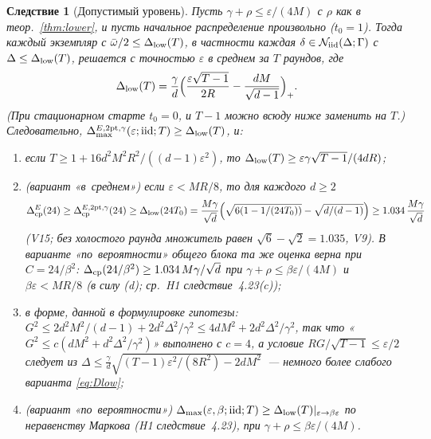 \documentclass[11pt,a4paper]{article}
\numberwithin{equation}{section}
\newtheorem{corollary}[theorem]{Следствие}
\theoremstyle{definition}
\theoremstyle{remark}
\newcommand{\Dmax}{\Delta_{\max}}\newcommand{\Dcp}{\Delta_{\rm cp}}\newcommand{\Dlow}{\Delta_{\rm low}}
\newcommand{\cN}{\mathcal N}\newcommand{\cA}{\mathcal A}\newcommand{\cG}{\mathcal G}\newcommand{\cF}{\mathcal F}
\newcommand{\wbar}{\bar\omega}\newcommand{\Atwo}{\cA^{\rm 2pt}_\gamma}
\begin{document}
\begin{corollary}[Допустимый уровень]\label{cor:lower}
Пусть $\gamma+\rho\le\varepsilon/(4M)$ с $\rho$ как в теор.~\ref{thm:lower}, и пусть начальное распределение произвольно ($t_0=1$). Тогда каждый экземпляр с $\wbar/2\le\Dlow(T)$, в частности каждая $\delta\in\cN_\iid(\Delta;\Gamma)$ с $\Delta\le\Dlow(T)$, решается с точностью $\varepsilon$ в среднем за $T$ раундов, где
\begin{equation}\label{eq:Dlow}
\Dlow(T)=\frac\gamma d\Big(\frac{\varepsilon\sqrt{T-1}}{2R}-\frac{dM}{\sqrt{d-1}}\Big)_+ .
\end{equation}
(При стационарном старте $t_0=0$, и $T-1$ можно всюду ниже заменить на $T$.) Следовательно, $\Dmax^{E,\mathrm{2pt},\gamma}(\varepsilon;\iid;T)\ge\Dlow(T)$, и:
\begin{enumerate}[label=(\alph*)]
\item если $T\ge1+16d^2M^2R^2/((d-1)\varepsilon^2)$, то $\Dlow(T)\ge\varepsilon\gamma\sqrt{T-1}/(4dR)$;
\item (вариант «в~среднем») если $\varepsilon<MR/8$, то для каждого $d\ge2$
\[\Dcp^{E}(24)\ge\Dcp^{E,\mathrm{2pt},\gamma}(24)\ge\Dlow(24T_0)=\frac{M\gamma}{\sqrt d}\Big(\sqrt{6(1-1/(24T_0))}-\sqrt{d/(d-1)}\Big)\ge1.034\,\frac{M\gamma}{\sqrt d}\] (V15; без холостого раунда множитель равен $\sqrt6-\sqrt2=1.035$, V9). В варианте «по~вероятности» общего блока та же оценка верна при $C=24/\beta^2$: $\Dcp(24/\beta^2)\ge1.034\,M\gamma/\sqrt d$ при $\gamma+\rho\le\beta\varepsilon/(4M)$ и $\beta\varepsilon<MR/8$ (в силу (d); ср.\ H1 следствие~4.23(c));
\item в форме, данной в формулировке гипотезы: $G^2\le2d^2M^2/(d-1)+2d^2\Delta^2/\gamma^2\le4dM^2+2d^2\Delta^2/\gamma^2$, так что «$G^2\le c(dM^2+d^2\Delta^2/\gamma^2)$» выполнено с $c=4$, а условие $RG/\sqrt{T-1}\le\varepsilon/2$ следует из $\Delta\le\frac\gamma d\sqrt{(T-1)\varepsilon^2/(8R^2)-2dM^2}$~--- немного более слабого варианта \eqref{eq:Dlow};
\item (вариант «по~вероятности») $\Dmax(\varepsilon,\beta;\iid;T)\ge\Dlow(T)|_{\varepsilon\to\beta\varepsilon}$ по неравенству Маркова (H1 следствие~4.23), при $\gamma+\rho\le\beta\varepsilon/(4M)$.
\end{enumerate}
\end{corollary}
\end{document}

